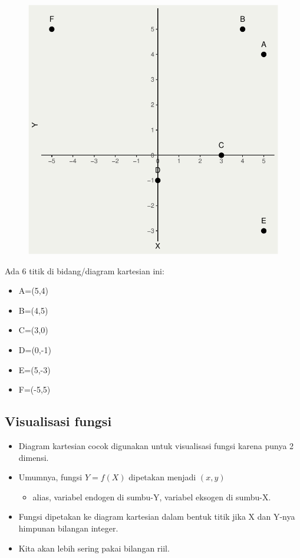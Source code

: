 \documentclass[
  letterpaper,
  DIV=11,
  numbers=noendperiod]{scrartcl}
\providecommand{\tightlist}{%
  \setlength{\itemsep}{0pt}\setlength{\parskip}{0pt}}\usepackage{longtable,booktabs,array}
\begin{document}
\begin{figure}[H]

{\centering \includegraphics{index_files/figure-pdf/unnamed-chunk-1-1.pdf}

}

\end{figure}

Ada 6 titik di bidang/diagram kartesian ini:

\begin{itemize}
\tightlist
\item
  A=(5,4)
\item
  B=(4,5)
\item
  C=(3,0)
\item
  D=(0,-1)
\item
  E=(5,-3)
\item
  F=(-5,5)
\end{itemize}

\hypertarget{visualisasi-fungsi}{%
\subsection{Visualisasi fungsi}\label{visualisasi-fungsi}}

\begin{itemize}
\item
  Diagram kartesian cocok digunakan untuk visualisasi fungsi karena
  punya 2 dimensi.
\item
  Umumnya, fungsi \(Y=f(X)\) dipetakan menjadi \((x,y)\)

  \begin{itemize}
  \tightlist
  \item
    alias, variabel endogen di sumbu-Y, variabel eksogen di sumbu-X.
  \end{itemize}
\item
  Fungsi dipetakan ke diagram kartesian dalam bentuk titik jika X dan
  Y-nya himpunan bilangan integer.
\item
  Kita akan lebih sering pakai bilangan riil.
\end{itemize}
\end{document}
